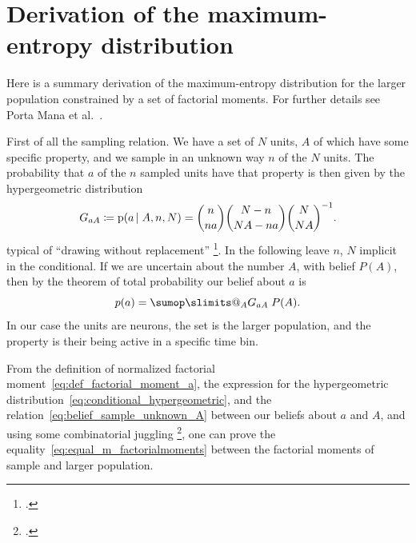 \documentclass[\ifafour a4paper,12pt,\else a5paper,10pt,\fi%
onecolumn,oneside,article,%
british%
]{memoir}
\makeatletter
\theoremstyle{remark}
\theoremstyle{innote}
\def\sum{\DOTSI\sumop\slimits@}
\newcommand*{\citep}{\footcites}
\newcommand*{\citey}{\parencites*}
\newcommand*{\defd}{\coloneqq}
\newcommand*{\pf}{\mathrm{p}}%
\renewcommand*{\|}{\nonscript\,\vert\nonscript\;\mathopen{}}
\newcommand*{\sect}{\S}%
\newcommand*{\chap}{ch.}%
\newcommand*{\chaps}{chs}%
\newcommand*{\etal}{{et al.}}
\newcommand*{\yG}{G}
\newcommand*{\yAv}{A}
\newcommand*{\yav}{a}
\newcommand*{\ya}{\yav}%
\newcommand*{\yA}{\yAv}%
\makeatother
\begin{document}
\appendix

\section{Derivation of the maximum-entropy distribution}
\label{sec:derivation_maxent_fullnet}

Here is a summary derivation of the maximum-entropy distribution for the
larger population constrained by a set of factorial moments. For further details
see Porta Mana \etal\ \citey{portamanaetal2015}.

\bigskip

First of all the sampling relation. We have a set of $N$ units, $\yA$ of
which have some specific property, and we sample in an unknown way $n$ of
the $N$ units. The probability that $\ya$ of the $n$ sampled units have that
property is then given by the hypergeometric distribution
\begin{equation}
  \label{eq:conditional_hypergeometric}
  \yG_{\ya\yA} \defd \pf(\ya \|\yA, n,N)=
  \binom{n}{n\ya}\binom{N-n}{N \yA-n\ya}\binom{N}{N \yA}^{-1}.
\end{equation}
typical of \enquote{drawing without replacement}
\citep[\chap~3]{jaynes1994_r2003}[\sect~4.8.3]{ross1976_r2010}[\sect~II.6]{feller1950_r1968}.
In the following leave $n$, $N$ implicit in the conditional. If we are
uncertain about the number $\yA$, with belief $P(\yA)$, then by the theorem
of total probability our belief about $\ya$ is
\begin{equation}
  \label{eq:belief_sample_unknown_A}
  p(\ya)= \sum_{\yA} \yG_{\ya\yA} \;P(\yA).
\end{equation}
In our case the units are neurons, the set is the larger population, and the
property is their being active in a specific time bin.

From the definition of normalized factorial
moment~\eqref{eq:def_factorial_moment_a}, the expression for the
hypergeometric distribution~\eqref{eq:conditional_hypergeometric}, and the
relation~\eqref{eq:belief_sample_unknown_A} between our beliefs about $\ya$
and $\yA$, and using some combinatorial juggling
\citep[\chaps~I--IV]{whitworth1867_r1965}[\chap~II]{feller1950_r1968}[appendix~A]{portamanaetal2015}{potts1953}, one
can prove the equality~\eqref{eq:equal_m_factorialmoments} between the
factorial moments of sample and larger population.
\end{document}
